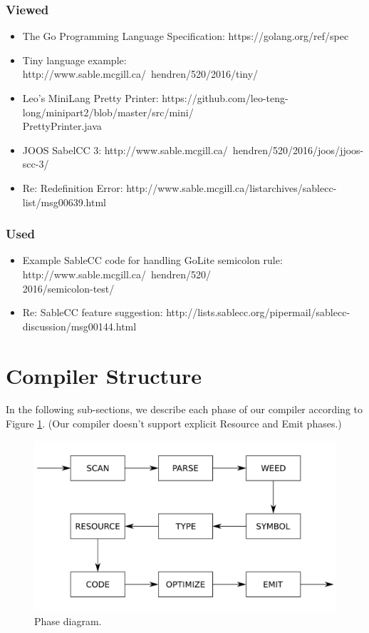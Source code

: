 \documentclass{article}
\begin{document}
\subsubsection{Viewed}
\begin{itemize}
\item The Go Programming Language Specification: https://golang.org/ref/spec
\item Tiny language example: http://www.sable.mcgill.ca/~hendren/520/2016/tiny/
\item Leo's MiniLang Pretty Printer: https://github.com/leo-teng-long/minipart2/blob/master/src/mini/\\
PrettyPrinter.java
\item JOOS SabelCC 3: http://www.sable.mcgill.ca/~hendren/520/2016/joos/jjoos-scc-3/
\item Re: Redefinition Error: http://www.sable.mcgill.ca/listarchives/sablecc-list/msg00639.html
\end{itemize}

\subsubsection{Used}
\begin{itemize}
\item Example SableCC code for handling GoLite semicolon rule: http://www.sable.mcgill.ca/~hendren/520/\\
2016/semicolon-test/
\item Re: SableCC feature suggestion: http://lists.sablecc.org/pipermail/sablecc-discussion/msg00144.html
\end{itemize}
\section{Compiler Structure}

In the following sub-sections, we describe each phase of our compiler according to Figure \ref{fig:phase}. (Our compiler doesn't support explicit Resource and Emit phases.)

\begin{figure}[h]
  \centering
  \includegraphics[width=\linewidth]{phase.pdf}
  \caption{Phase diagram.}
  \label{fig:phase}
\end{figure}
\end{document}
